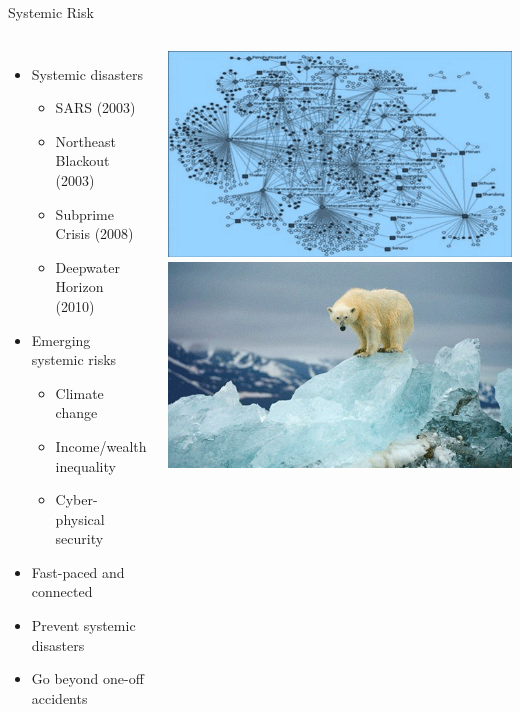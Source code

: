 
\begin{frame}{Systemic Risk}
\begin{columns}[c]
		\begin{itemize}[<+->]
		\item Systemic disasters
		\begin{itemize}
			\item SARS (2003)
			\item Northeast Blackout (2003)
			\item Subprime Crisis (2008)
			\item Deepwater Horizon
			(2010)
		\end{itemize}
		\item Emerging systemic risks
		\begin{itemize}
			\item Climate change
			\item Income/wealth inequality
			\item Cyber-physical security
		\end{itemize}
		\item Fast-paced and connected
		\item Prevent systemic disasters
		\item Go beyond one-off accidents
		\end{itemize}
	   \includegraphics[width = .5\linewidth]{fig/wide_SARS.png}
	   \onslide<7->
	   \includegraphics[width = .5\linewidth]{fig/wide_polarbear.png}\\%

\end{columns}
\end{frame}
